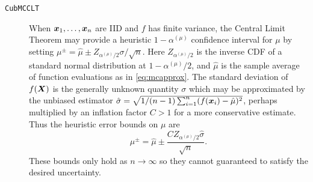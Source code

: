 \documentclass{article}[12pt]
\begin{document}
\begin{description}
    \item[\texttt{CubMCCLT}] When $\boldsymbol{x}_1,\dots,\boldsymbol{x}_n$ are IID and $f$ has finite variance, the Central Limit Theorem may provide a heuristic $1-\alpha^{(\mu)}$ confidence interval for $\mu$ by setting $\mu^\pm = \hat{\mu} \pm Z_{\alpha^{(\mu)}/2}\sigma/\sqrt{n}$. Here $Z_{\alpha^{(\mu)}/2}$ is the inverse CDF of a standard normal distribution at $1-\alpha^{(\mu)}/2$, and $\hat{\mu}$ is the sample average of function evaluations as in \eqref{eq:mcapprox}. The standard deviation of $f(\boldsymbol{X})$ is the generally unknown quantity $\sigma$ which may be approximated by the unbiased estimator $\hat{\sigma} = \sqrt{1/(n-1)\sum_{i=1}^n(f(\boldsymbol{x}_i)-\hat{\mu})^2}$, perhaps multiplied by an inflation factor $C>1$ for a more conservative estimate. Thus the heuristic error bounds on $\mu$ are
    \begin{equation*}
        \mu^\pm = \hat{\mu} \pm \frac{CZ_{\alpha^{(\mu)}/2}\hat{\sigma}}{\sqrt{n}}
        \label{eq:clt_mu_bounds}.
    \end{equation*}
    These bounds only hold as $n \to \infty$ so they cannot guaranteed to satisfy the desired uncertainty. 
    

\end{description}
\end{document}
